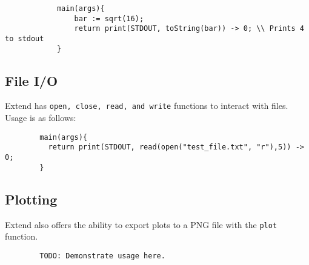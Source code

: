 		\begin{lstlisting}
			main(args){
				bar := sqrt(16);
				return print(STDOUT, toString(bar)) -> 0; \\ Prints 4 to stdout
			}
		\end{lstlisting}

	\subsection{File I/O}
	Extend has \texttt{open, close, read, and write} functions to interact with files. Usage is as follows:

	\begin{lstlisting}
		main(args){
		  return print(STDOUT, read(open("test_file.txt", "r"),5)) -> 0;
		}
	\end{lstlisting}

	\subsection{Plotting}
	Extend also offers the ability to export plots to a PNG file with the \texttt{plot} function.

	\begin{lstlisting}
		TODO: Demonstrate usage here.
	\end{lstlisting}
